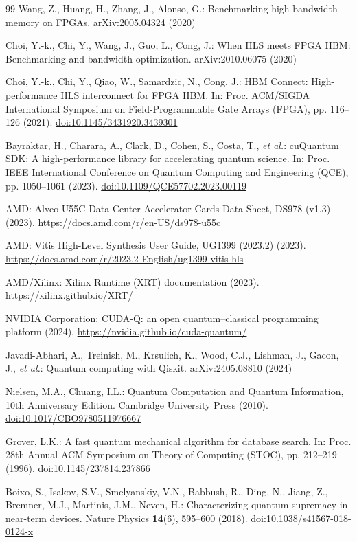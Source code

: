 \documentclass[pdflatex,sn-mathphys-num]{sn-jnl}
\providecommand{\doi}[1]{\href{https://doi.org/#1}{doi:#1}}
\theoremstyle{thmstyleone}
\theoremstyle{thmstylethree}
\begin{document}
\begin{thebibliography}{99}
Wang, Z., Huang, H., Zhang, J., Alonso, G.: Benchmarking high bandwidth memory on FPGAs. arXiv:2005.04324 (2020)

Choi, Y.-k., Chi, Y., Wang, J., Guo, L., Cong, J.: When HLS meets FPGA HBM: Benchmarking and bandwidth optimization. arXiv:2010.06075 (2020)

Choi, Y.-k., Chi, Y., Qiao, W., Samardzic, N., Cong, J.: HBM Connect: High-performance HLS interconnect for FPGA HBM. In: Proc. ACM/SIGDA International Symposium on Field-Programmable Gate Arrays (FPGA), pp. 116--126 (2021). \doi{10.1145/3431920.3439301}

Bayraktar, H., Charara, A., Clark, D., Cohen, S., Costa, T., \emph{et al.}: cuQuantum SDK: A high-performance library for accelerating quantum science. In: Proc. IEEE International Conference on Quantum Computing and Engineering (QCE), pp. 1050--1061 (2023). \doi{10.1109/QCE57702.2023.00119}

AMD: Alveo U55C Data Center Accelerator Cards Data Sheet, DS978 (v1.3) (2023). \url{https://docs.amd.com/r/en-US/ds978-u55c}

AMD: Vitis High-Level Synthesis User Guide, UG1399 (2023.2) (2023). \url{https://docs.amd.com/r/2023.2-English/ug1399-vitis-hls}

AMD/Xilinx: Xilinx Runtime (XRT) documentation (2023). \url{https://xilinx.github.io/XRT/}

NVIDIA Corporation: CUDA-Q: an open quantum--classical programming platform (2024). \url{https://nvidia.github.io/cuda-quantum/}

Javadi-Abhari, A., Treinish, M., Krsulich, K., Wood, C.J., Lishman, J., Gacon, J., \emph{et al.}: Quantum computing with Qiskit. arXiv:2405.08810 (2024)

Nielsen, M.A., Chuang, I.L.: Quantum Computation and Quantum Information, 10th Anniversary Edition. Cambridge University Press (2010). \doi{10.1017/CBO9780511976667}

Grover, L.K.: A fast quantum mechanical algorithm for database search. In: Proc. 28th Annual ACM Symposium on Theory of Computing (STOC), pp. 212--219 (1996). \doi{10.1145/237814.237866}

Boixo, S., Isakov, S.V., Smelyanskiy, V.N., Babbush, R., Ding, N., Jiang, Z., Bremner, M.J., Martinis, J.M., Neven, H.: Characterizing quantum supremacy in near-term devices. Nature Physics \textbf{14}(6), 595--600 (2018). \doi{10.1038/s41567-018-0124-x}


\end{thebibliography}
\end{document}
